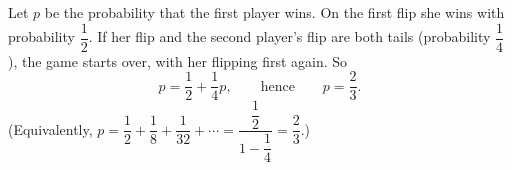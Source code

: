 Let $p$ be the probability that the first player wins. On the first flip she wins with probability $\dfrac{1}{2}$. If her flip and the second player's flip are both tails (probability $\dfrac{1}{4}$), the game starts over, with her flipping first again. So
\[
p=\dfrac{1}{2}+\dfrac{1}{4}p ,\qquad\text{hence}\qquad p=\boxed{\dfrac{2}{3}}.
\]
(Equivalently, $p=\dfrac{1}{2}+\dfrac{1}{8}+\dfrac{1}{32}+\cdots=\dfrac{\dfrac{1}{2}}{1-\dfrac{1}{4}}=\dfrac{2}{3}$.)
